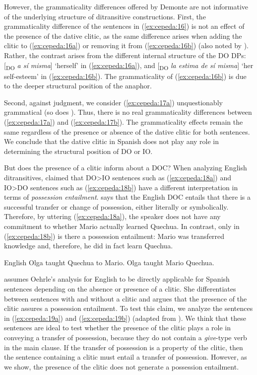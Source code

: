 \documentclass[output=paper,colorlinks,citecolor=brown,nonflat]{./langscibook}
\begin{document}
However, the grammaticality differences offered by Demonte are not informative of the underlying structure of ditransitive constructions. First, the grammaticality difference of the sentences in (\ref{ex:cepeda:16}) is not an effect of the presence of the dative clitic, as the same difference arises when adding the clitic to (\ref{ex:cepeda:16a}) or removing it from (\ref{ex:cepeda:16b}) (also noted by \citealt{Pineda2013}). Rather, the contrast arises from the different internal structure of the DO DPs: [\textsubscript{DO} \textit{a sí misma}] ‘herself’ in (\ref{ex:cepeda:16a}), and [\textsubscript{DO} \textit{la estima de sí misma}] ‘her self-esteem’ in (\ref{ex:cepeda:16b}). The grammaticality of (\ref{ex:cepeda:16b}) is due to the deeper structural position of the anaphor.

Second, against  judgment, we consider (\ref{ex:cepeda:17a}) unquestionably grammatical (so does \citealt{Pineda2013}). Thus, there is no real grammaticality differences between (\ref{ex:cepeda:17a}) and (\ref{ex:cepeda:17b}). The grammaticality effects remain the same regardless of the presence or absence of the dative clitic for both sentences. We conclude that the dative clitic in Spanish does not play any role in determining the structural position of DO or IO.

But does the presence of a clitic inform about a DOC? When analyzing English ditransitives, \citet{Oehrle1976} claimed that DO>IO sentences such as (\ref{ex:cepeda:18a}) and IO>DO sentences such as (\ref{ex:cepeda:18b}) have a different interpretation in terms of \textit{possession entailment}. \citeauthor{Oehrle1976} says that the English DOC entails that there is a successful transfer or change of possession, either literally or symbolically. Therefore, by uttering (\ref{ex:cepeda:18a}), the speaker does not have any commitment to whether Mario actually learned Quechua. In contrast, only in (\ref{ex:cepeda:18b}) is there a possession entailment: Mario was transferred knowledge and, therefore, he did in fact learn Quechua.

\ea%
    \label{ex:cepeda:18} English
	\ea\label{ex:cepeda:18a} Olga taught Quechua to Mario.
	\ex\label{ex:cepeda:18b} Olga taught Mario Quechua.
	\z
\z

\citet{Demonte1995} assumes Oehrle’s analysis for English to be directly applicable for Spanish sentences depending on the absence or presence of a clitic. She differentiates between sentences with and without a clitic and argues that the presence of the clitic assures a possession entailment. To test this claim, we analyze the sentences in (\ref{ex:cepeda:19a}) and (\ref{ex:cepeda:19b}) (adapted from \citeauthor{Demonte1995}). We think that these sentences are ideal to test whether the presence of the clitic plays a role in conveying a transfer of possession, because they do not contain a \textit{give}-type verb in the main clause. If the transfer of possession is a property of the clitic, then the sentence containing a clitic must entail a transfer of possession. However, as we show, the presence of the clitic does not generate a possession entailment.
\end{document}
